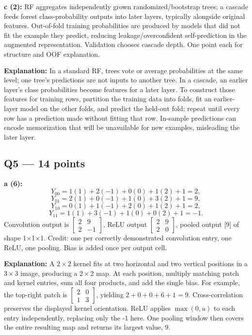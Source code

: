 \documentclass[11pt]{article}
\begin{document}
\textbf{c (2):} RF aggregates independently grown randomized/\allowbreak{}bootstrap trees; a cascade feeds forest class-probability outputs into later layers, typically alongside original features. Out-of-fold training probabilities are produced by models that did not fit the example they predict, reducing leakage/\allowbreak{}overconfident self-prediction in the augmented representation. Validation chooses cascade depth. One point each for structure and OOF explanation.

\textbf{Explanation:} In a standard RF, trees vote or average probabilities at the same level; one tree's predictions are not inputs to another tree. In a cascade, an earlier layer's class probabilities become features for a later layer. To construct those features for training rows, partition the training data into folds, fit an earlier-layer model on the other folds, and predict the held-out fold; repeat until every row has a prediction made without fitting that row. In-sample predictions can encode memorization that will be unavailable for new examples, misleading the later layer.


\subsection*{Q5 — 14 points}

\textbf{a (6):}
\[
Y_{00}=1(1)+2(-1)+0(0)+1(2)+1=2,
\]
\[
Y_{01}=2(1)+0(-1)+1(0)+3(2)+1=9,
\]
\[
Y_{10}=0(1)+1(-1)+2(0)+1(2)+1=2,
\]
\[
Y_{11}=1(1)+3(-1)+1(0)+0(2)+1=-1.
\]
Convolution output is $\begin{bmatrix}2&9\\2&-1\end{bmatrix}$, ReLU output $\begin{bmatrix}2&9\\2&0\end{bmatrix}$, pooled output [9] of shape 1\ensuremath{\times}1\ensuremath{\times}1. Credit: one per correctly demonstrated convolution entry, one ReLU, one pooling. Bias is added once per output cell.

\textbf{Explanation:} A $2\times2$ kernel fits at two horizontal and two vertical positions in a $3\times3$ image, producing a $2\times2$ map. At each position, multiply matching patch and kernel entries, sum all four products, and add the single bias. For example, the top-right patch is $\begin{bmatrix}2&0\\1&3\end{bmatrix}$, yielding $2+0+0+6+1=9$. Cross-correlation preserves the displayed kernel orientation. ReLU applies $\max(0,u)$ to each entry independently, replacing only the -1 here. One pooling window then covers the entire resulting map and returns its largest value, 9.
\end{document}
